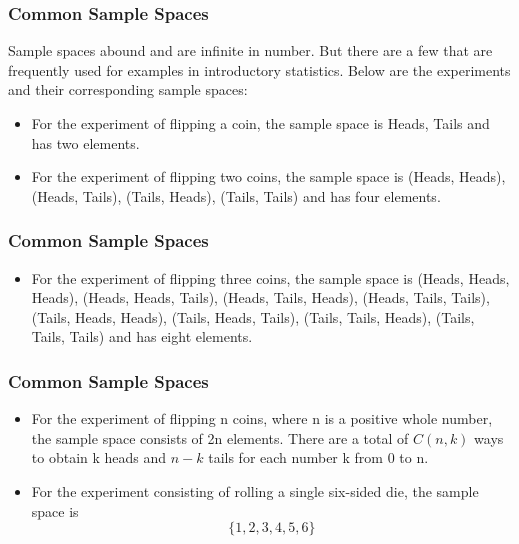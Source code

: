 \documentclass[IntroMain.tex]{subfiles}
\begin{document}
\begin{frame}
	\frametitle{Common Sample Spaces}
	
	Sample spaces abound and are infinite in number. But there are a few that are frequently used for examples in introductory statistics. Below are the experiments and their corresponding sample spaces:
	
	\begin{itemize}
		\item For the experiment of flipping a coin, the sample space is {Heads, Tails} and has two elements.
		
		\item For the experiment of flipping two coins, the sample space is {(Heads, Heads), (Heads, Tails), (Tails, Heads), (Tails, Tails) } and has four elements.
	\end{itemize}
	\end{frame}
\begin{frame}
	\frametitle{Common Sample Spaces}
	\begin{itemize}

		\item For the experiment of flipping three coins, the sample space is {(Heads, Heads, Heads), (Heads, Heads, Tails), (Heads, Tails, Heads), (Heads, Tails, Tails), (Tails, Heads, Heads), (Tails, Heads, Tails), (Tails, Tails, Heads), (Tails, Tails, Tails) } and has eight elements.
	\end{itemize}
\end{frame}
\begin{frame}
	\frametitle{Common Sample Spaces}
	\begin{itemize}
				
		\item For the experiment of flipping n coins, where n is a positive whole number, the sample space consists of 2n elements. There are a total of $C(n, k)$ ways to obtain k heads and $n - k$ tails for each number k from 0 to n.
		
		\item For the experiment consisting of rolling a single six-sided die, the sample space is 
		\[\{1, 2, 3, 4, 5, 6\} \]
	\end{itemize}
\end{frame}
\end{document}
